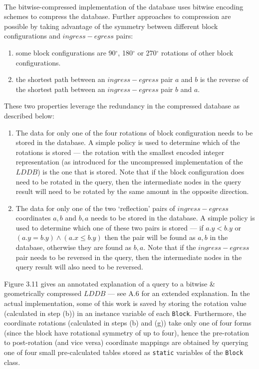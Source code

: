 \documentclass[12pt,notitlepage]{report}
\begin{document}
\\
\noindent
The bitwise-compressed implementation of the database uses bitwise encoding schemes to compress the database. Further approaches to compression are possible by taking advantage of the symmetry between different block configurations and $ingress-egress$ pairs:
\begin{enumerate}
\item some block configurations are 90$^{\circ}$,  180$^{\circ}$ or 270$^{\circ}$ rotations of other block configurations.
\item the shortest path between an $ingress-egress$ pair $a$ and $b$ is the reverse of the shortest path between an $ingress-egress$ pair $b$ and $a$. 
\end{enumerate}

These two properties leverage the redundancy in the compressed database as described below:
\begin{enumerate}
\item The data for only one of the four rotations of block configuration needs to be stored in the database. A simple policy is used to determine which of the rotations is stored --- the rotation with the smallest encoded integer representation (as introduced for the uncompressed implementation of the $LDDB$) is the one that is stored. Note that if the block configuration does need to be rotated in the query, then the intermediate nodes in the query result will need to be rotated by the same amount in the opposite direction. 
\item The data for only one of the two `reflection' pairs of $ingress-egress$ coordinates $a,b$ and $b,a$ needs to be stored in the database. A simple policy is used to determine which one of these two pairs is stored --- if $a.y < b.y$ or $(a.y = b.y) \land (a.x \leq b.y)$ then the pair will be found as $a,b$ in the database, otherwise they are found as $b,a$. Note that if the $ingress-egress$ pair needs to be reversed in the query, then the intermediate nodes in the query result will also need to be reversed. 
\end{enumerate}

\noindent
Figure 3.11 gives an annotated explanation of a query to a bitwise \& geometrically compressed $LDDB$ --- see A.6 for an extended explanation. In the actual implementation, some of this work is saved by storing the rotation value (calculated in step (b)) in an instance variable of each {\tt Block}. Furthermore, the coordinate rotations (calculated in steps (b) and (g)) take only one of four forms (since the block have rotational symmetry of up to four), hence the pre-rotation to post-rotation (and vice versa) coordinate mappings are obtained by querying one of four small pre-calculated tables stored as {\tt static} variables of the {\tt Block} class.\\
\end{document}
